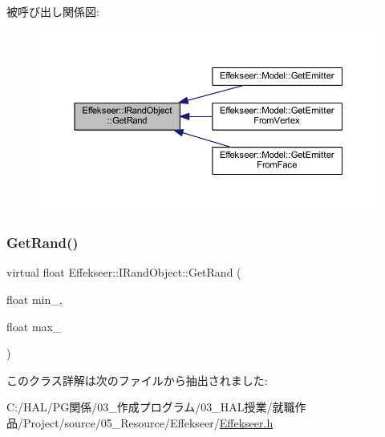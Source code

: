 被呼び出し関係図\+:\nopagebreak
\begin{figure}[H]
\begin{center}
\leavevmode
\includegraphics[width=350pt]{class_effekseer_1_1_i_rand_object_aecc4fce270de1c127f19a53b1ca09454_icgraph}
\end{center}
\end{figure}
\mbox{\label{class_effekseer_1_1_i_rand_object_a2c7b39779f597094973517df4afa0b48}} 
\subsubsection{\texorpdfstring{Get\+Rand()}{GetRand()}\hspace{0.1cm}{\footnotesize\ttfamily [2/2]}}
{\footnotesize\ttfamily virtual float Effekseer\+::\+I\+Rand\+Object\+::\+Get\+Rand (\begin{DoxyParamCaption}\item[{float}]{min\+\_\+,  }\item[{float}]{max\+\_\+ }\end{DoxyParamCaption})\hspace{0.3cm}{\ttfamily [pure virtual]}}



このクラス詳解は次のファイルから抽出されました\+:\begin{DoxyCompactItemize}
\item 
C\+:/\+H\+A\+L/\+P\+G関係/03\+\_\+作成プログラム/03\+\_\+\+H\+A\+L授業/就職作品/\+Project/source/05\+\_\+\+Resource/\+Effekseer/\mbox{\hyperlink{_effekseer_8h}{Effekseer.\+h}}\end{DoxyCompactItemize}
